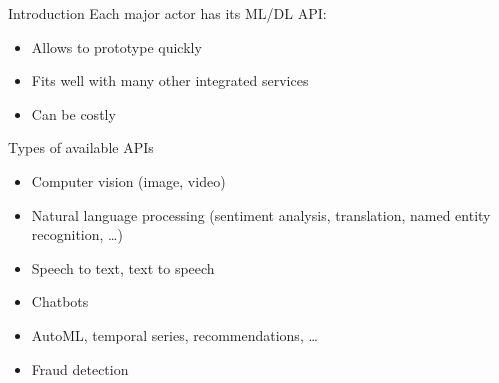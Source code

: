 \begin{frame}{Introduction}
  Each major actor has its ML/DL API:

  \begin{itemize}[<+->]
    \item Allows to prototype quickly
    \item Fits well with many other integrated services
    \item Can be costly
  \end{itemize}
\end{frame}

\begin{frame}{Types of available APIs}
  \begin{itemize}[<+->]
    \item Computer vision (image, video)
    \item Natural language processing (sentiment analysis, translation, named entity recognition, …)
    \item Speech to text, text to speech
    \item Chatbots
    \item AutoML, temporal series, recommendations, …
    \item Fraud detection
  \end{itemize}
\end{frame}

